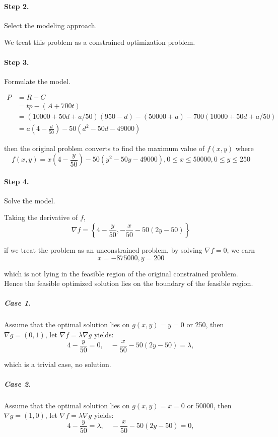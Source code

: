 \documentclass[11pt]{article}
\begin{document}
 \paragraph{Step 2.} Select the modeling approach.
 
 We treat this problem as a constrained optimization problem.
 
 \paragraph{Step 3.} Formulate the model.
 
$$
 \begin{aligned}
 P & = R - C \\
 & = tp  - (A + 700t)\\
 &= (10000 + 50d + a/50)(950-d) - (50000 + a) - 700(10000 + 50d + a/50)\\
 &= a \left(4-\frac{d}{50}\right)-50 \left(d^2-50 d-49000\right)
 \end{aligned}
$$
 
then the original problem converts to find the maximum value of $f(x,y)$ where
$$
f(x,y) = x \left(4-\frac{y}{50}\right)-50 \left(y^2-50 y-49000\right) , 0\leq x\leq 50000, 0\leq y \leq 250
$$

\paragraph{Step 4.} Solve the model.

Taking the derivative of $f$,
$$
\nabla f = \left\{4-\frac{y}{50},-\frac{x}{50}-50 (2 y-50)\right\}
$$

if we treat the problem as an unconstrained problem, by solving $\nabla f = 0$, we earn 
$$
{x = -875000, y = 200}
$$

which is not lying in the feasible region of the original constrained problem. Hence the feasible optimized solution lies on the boundary of the feasible region.

\subparagraph{Case 1.} Assume that the optimal solution lies on $g(x,y)  = y  = 0$ or 250, then $\nabla g = (0,1)$, let $\nabla f = \lambda \nabla g$ yields:
$$
4-\frac{y}{50} = 0 ,\quad 
-\frac{x}{50}-50 (2 y-50) = \lambda, 
$$

which is a trivial case, no solution.

\subparagraph{Case 2.} Assume that the optimal solution lies on $g(x,y)  = x  = 0$ or 50000, then $\nabla g = (1,0)$, let $\nabla f = \lambda \nabla g$ yields:
$$
4-\frac{y}{50} = \lambda ,\quad 
-\frac{x}{50}-50 (2 y-50) = 0, 
$$
\end{document}
